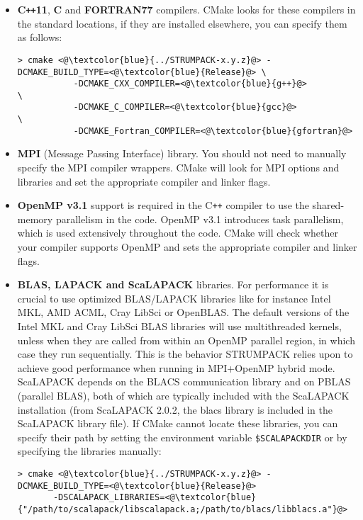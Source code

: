 \documentclass{article}
\newcommand{\tm}{\textsuperscript{\textregistered}}
\begin{document}
\begin{itemize}
\item \textbf{C\texttt{++}11}, \textbf{C} and \textbf{FORTRAN77}
  compilers. CMake looks for these compilers in the standard
  locations, if they are installed elsewhere, you can specify them as
  follows:
  \begin{lstlisting}[style=Bash]
    > cmake <@\textcolor{blue}{../STRUMPACK-x.y.z}@> -DCMAKE_BUILD_TYPE=<@\textcolor{blue}{Release}@> \
           -DCMAKE_CXX_COMPILER=<@\textcolor{blue}{g++}@>                       \
           -DCMAKE_C_COMPILER=<@\textcolor{blue}{gcc}@>                         \
           -DCMAKE_Fortran_COMPILER=<@\textcolor{blue}{gfortran}@>
  \end{lstlisting}
\item \textbf{MPI} (Message Passing Interface) library.  You should
  not need to manually specify the MPI compiler wrappers.  CMake will
  look for MPI options and libraries and set the appropriate compiler
  and linker flags.
\item \textbf{OpenMP v3.1} support is required in the C\texttt{++}
  compiler to use the shared-memory parallelism in the code. OpenMP
  v3.1 introduces task parallelism, which is used extensively
  throughout the code. CMake will check whether your compiler supports
  OpenMP and sets the appropriate compiler and linker flags.
\item \textbf{BLAS, LAPACK and ScaLAPACK} libraries. For performance
  it is crucial to use optimized BLAS/LAPACK libraries like for
  instance Intel\tm{} MKL, AMD\tm{} ACML, Cray\tm{} LibSci or
  OpenBLAS. The default versions of the Intel\tm{} MKL and Cray\tm{}
  LibSci BLAS libraries will use multithreaded kernels, unless when
  they are called from within an OpenMP parallel region, in which case
  they run sequentially. This is the behavior STRUMPACK relies upon to
  achieve good performance when running in MPI+OpenMP hybrid
  mode. ScaLAPACK depends on the BLACS communication library and on
  PBLAS (parallel BLAS), both of which are typically included with the
  ScaLAPACK installation (from ScaLAPACK 2.0.2, the blacs library is
  included in the ScaLAPACK library file). If CMake cannot locate
  these libraries, you can specify their path by setting the
  environment variable
  \lstinline[style=Bash]!$SCALAPACKDIR! or by specifying the libraries
  manually:
  \begin{lstlisting}[style=Bash]
    > cmake <@\textcolor{blue}{../STRUMPACK-x.y.z}@> -DCMAKE_BUILD_TYPE=<@\textcolor{blue}{Release}@>
       -DSCALAPACK_LIBRARIES=<@\textcolor{blue}{"/path/to/scalapack/libscalapack.a;/path/to/blacs/libblacs.a"}@>

\end{lstlisting}
\end{itemize}
\end{document}
